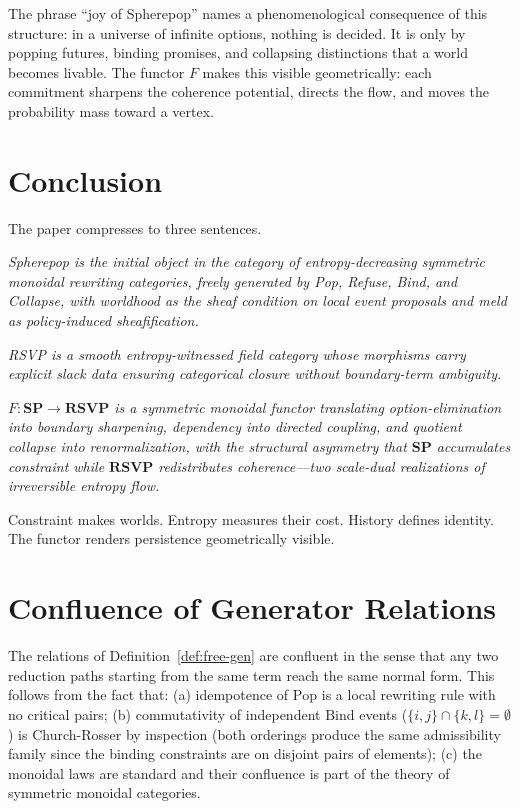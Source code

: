 \documentclass[12pt,a4paper]{article}
\theoremstyle{definition}
\theoremstyle{remark}
\newcommand{\SP}{\mathbf{SP}}
\newcommand{\RSVP}{\mathbf{RSVP}}
\newcommand{\Pop}{\mathrm{Pop}}
\newcommand{\Bind}{\mathrm{Bind}}
\begin{document}
The phrase ``joy of Spherepop'' names a phenomenological consequence of this structure:
in a universe of infinite options, nothing is decided. It is only by popping futures,
binding promises, and collapsing distinctions that a world becomes livable. The
functor $F$ makes this visible geometrically: each commitment sharpens the coherence
potential, directs the flow, and moves the probability mass toward a vertex.

\section{Conclusion}
\label{sec:conclusion}

The paper compresses to three sentences.

\medskip
\noindent
\emph{Spherepop is the initial object in the category of entropy-decreasing symmetric
monoidal rewriting categories, freely generated by Pop, Refuse, Bind, and Collapse,
with worldhood as the sheaf condition on local event proposals and meld as
policy-induced sheafification.}

\medskip
\noindent
\emph{RSVP is a smooth entropy-witnessed field category whose morphisms carry
explicit slack data ensuring categorical closure without boundary-term ambiguity.}

\medskip
\noindent
\emph{$F:\SP\to\RSVP$ is a symmetric monoidal functor translating option-elimination
into boundary sharpening, dependency into directed coupling, and quotient collapse
into renormalization, with the structural asymmetry that $\SP$ accumulates constraint
while $\RSVP$ redistributes coherence—two scale-dual realizations of irreversible
entropy flow.}

\medskip
Constraint makes worlds. Entropy measures their cost. History defines identity.
The functor renders persistence geometrically visible.

\appendix

\section{Confluence of Generator Relations}
\label{app:confluence}

The relations of Definition~\ref{def:free-gen} are confluent in the sense that any
two reduction paths starting from the same term reach the same normal form. This
follows from the fact that:
(a) idempotence of $\Pop$ is a local rewriting rule with no critical pairs;
(b) commutativity of independent $\Bind$ events ($\{i,j\}\cap\{k,l\}=\emptyset$)
is Church-Rosser by inspection (both orderings produce the same admissibility family
since the binding constraints are on disjoint pairs of elements);
(c) the monoidal laws are standard and their confluence is part of the theory of
symmetric monoidal categories.
\end{document}
